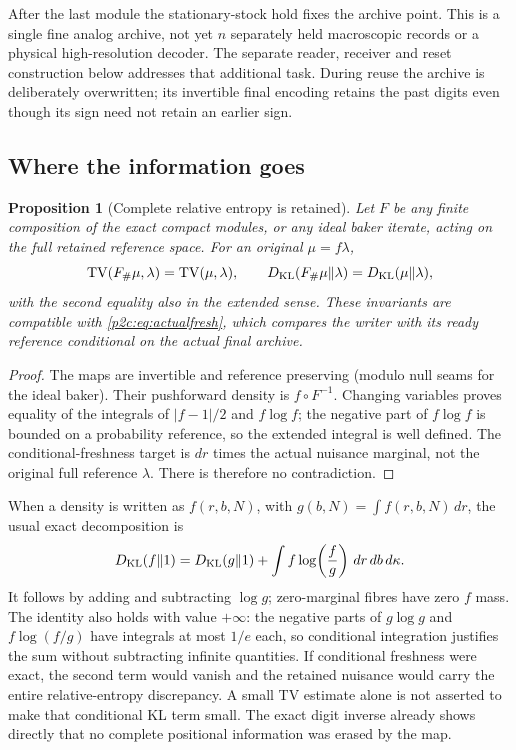 \documentclass[11pt]{article}
\numberwithin{equation}{section}
\newtheorem{proposition}[theorem]{Proposition}
\theoremstyle{definition}
\theoremstyle{remark}
\begin{document}
After the last module the stationary-stock hold fixes
the archive point. This is a single fine analog archive,
not yet $n$ separately held macroscopic records or a
physical high-resolution decoder. The separate reader,
receiver and reset construction below addresses that
additional task. During reuse the archive is deliberately
overwritten; its invertible final encoding retains the
past digits even though its sign need not retain an
earlier sign.

\subsection{Where the information goes}

\begin{proposition}[Complete relative entropy is retained]
\label{p2c:prop:entropy}
Let $F$ be any finite composition of the exact compact
modules, or any ideal baker iterate, acting on the full
retained reference space. For an original $\mu=f\lambda$,
\begin{equation}\label{p2c:eq:entropy}
 \operatorname{TV}(F_\#\mu,\lambda)
       =\operatorname{TV}(\mu,\lambda),\qquad
 D_{\rm KL}(F_\#\mu\|\lambda)
       =D_{\rm KL}(\mu\|\lambda),
\end{equation}
with the second equality also in the extended sense.
These invariants are compatible with
\eqref{p2c:eq:actualfresh}, which compares the writer
with its ready reference \emph{conditional on the
actual final archive}.
\end{proposition}

\begin{proof}
The maps are invertible and reference preserving
(modulo null seams for the ideal baker). Their
pushforward density is $f\circ F^{-1}$.
Changing variables proves equality of the integrals
of $|f-1|/2$ and $f\log f$; the negative part of
$f\log f$ is bounded on a probability reference,
so the extended integral is well defined.
The conditional-freshness target is
$dr$ times the actual nuisance marginal, not the
original full reference $\lambda$. There is
therefore no contradiction.
\end{proof}

When a density is written as $f(r,b,N)$, with
$g(b,N)=\int f(r,b,N)\,dr$, the usual exact
decomposition is
\[
 D_{\rm KL}(f\|1)
 =D_{\rm KL}(g\|1)
  +\int f\log\!\left(\frac{f}{g}\right)\,dr\,db\,d\kappa .
\]
It follows by adding and subtracting $\log g$;
zero-marginal fibres have zero $f$ mass. The identity also holds with
value $+\infty$: the negative parts of $g\log g$ and
$f\log(f/g)$ have integrals at most $1/e$ each, so conditional
integration justifies the sum without subtracting infinite quantities.
If conditional freshness were exact, the second term would vanish
and the retained nuisance would carry the entire
relative-entropy discrepancy. A small TV estimate
alone is not asserted to make that conditional KL
term small. The exact digit inverse already shows
directly that no complete positional information
was erased by the map.
\end{document}
